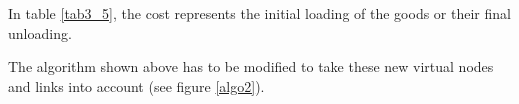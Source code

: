 In table \ref{tab3_5}, the cost represents the initial loading of the goods or their final unloading.

The algorithm shown above has to be modified to take these new virtual
nodes and links into account (see figure \ref{algo2}).


\begin{center}
\begin{figure}[htbp]
\center
{}
\end{figure}
\end{center}
